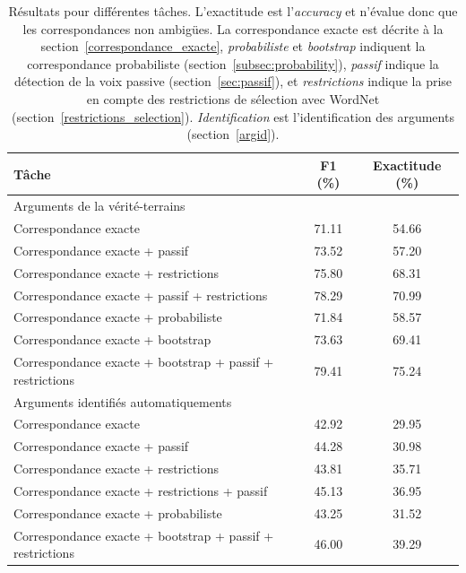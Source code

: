 \begin{table}
    \centering
    \begin{tabular}{lcc}
        \toprule
        Tâche & F1 (\%) & Exactitude (\%) \\
        \midrule                                                   
        Arguments de la vérité-terrains & & \\
        \midrule 
        Correspondance exacte                                      & 71.11  & 54.66 \\
        Correspondance exacte + passif                             & 73.52  & 57.20 \\
        Correspondance exacte + restrictions                       & 75.80  & 68.31 \\
        Correspondance exacte + passif + restrictions              & 78.29  & 70.99 \\
        Correspondance exacte + probabiliste                       & 71.84  & 58.57 \\
        Correspondance exacte + bootstrap                          & 73.63  & 69.41 \\
        Correspondance exacte + bootstrap + passif + restrictions  & 79.41  & 75.24 \\
        \midrule                                                   
        Arguments identifiés automatiquements & & \\
        \midrule
        Correspondance exacte                          & 42.92  & 29.95 \\
        Correspondance exacte + passif                 & 44.28  & 30.98 \\
        Correspondance exacte + restrictions           & 43.81  & 35.71 \\
        Correspondance exacte + restrictions + passif  & 45.13  & 36.95 \\
        Correspondance exacte + probabiliste           & 43.25  & 31.52 \\
        Correspondance exacte + bootstrap + passif + restrictions   & 46.00 & 39.29 \\
        \bottomrule
    \end{tabular}

    \caption{\label{table:results}Résultats pour différentes tâches.
        L'exactitude est l'\textit{accuracy} et n'évalue donc que les
        correspondances non ambigües. La correspondance exacte est décrite à la
        section~\ref{correspondance_exacte}, \textit{probabiliste} et
        \textit{bootstrap} indiquent la correspondance probabiliste
        (section~\ref{subsec:probability}), \textit{passif} indique la
        détection de la voix passive (section~\ref{sec:passif}), et
        \textit{restrictions} indique la prise en compte des restrictions de
        sélection avec WordNet (section~\ref{restrictions_selection}).
        \textit{Identification} est l'identification des arguments
    (section~\ref{argid}).}
\end{table}

